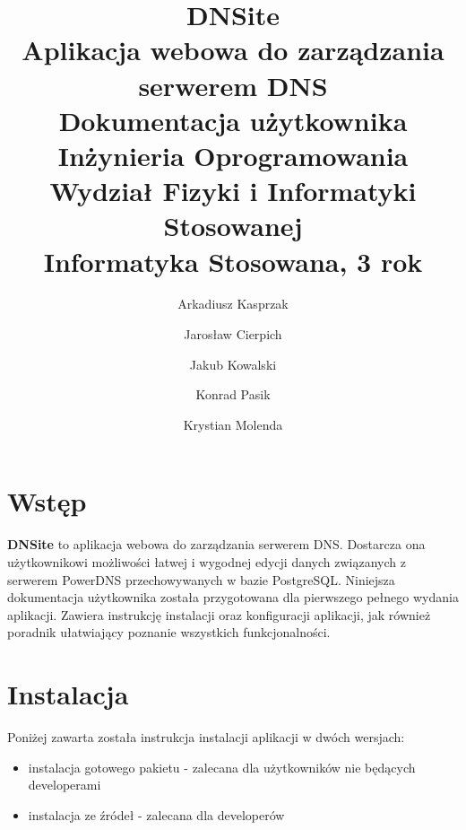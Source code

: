 \documentclass[12pt] {article}
\title 
{	
	{
		\textbf{\textsf{\Huge\color{orange}DNS\color{white}ite}} \\ [0.1in]
		\normalfont\sffamily\LARGE\color{white}
		Aplikacja webowa do zarządzania serwerem DNS \\[0.1in]
		Dokumentacja użytkownika\\ [1.5in]
		\large 
		Inżynieria Oprogramowania \\
		Wydział Fizyki i Informatyki Stosowanej \\
		Informatyka Stosowana, 3 rok \\
	}
}
\author 
{
	\color{white}\normalfont\sffamily Arkadiusz Kasprzak \and 
	\color{white}\normalfont\sffamily Jarosław Cierpich \and 
	\color{white}\normalfont\sffamily Jakub Kowalski \and 
	\color{white}\normalfont\sffamily Konrad Pasik \and 
	\color{white}\normalfont\sffamily Krystian Molenda
}
\date{}
\begin{document}
\pagecolor{backgroundColor}
\maketitle
\thispagestyle{empty}


\newpage
\clearpage
{}
\pagecolor{white}

\tableofcontents

\newpage 

\section{Wstęp}
\textbf{DNSite} to aplikacja webowa do zarządzania serwerem DNS. Dostarcza ona użytkownikowi możliwości łatwej i wygodnej edycji danych związanych z serwerem PowerDNS przechowywanych w bazie PostgreSQL.\newline
Niniejsza dokumentacja użytkownika została przygotowana dla pierwszego pełnego wydania aplikacji. Zawiera instrukcję instalacji oraz konfiguracji aplikacji, jak również poradnik ułatwiający poznanie wszystkich funkcjonalności.

\section{Instalacja}
Poniżej zawarta została instrukcja instalacji aplikacji w dwóch wersjach:
\begin{itemize}
\item instalacja gotowego pakietu - zalecana dla użytkowników nie będących developerami
\item instalacja ze źródeł - zalecana dla developerów 
\end{itemize}
\end{document}

